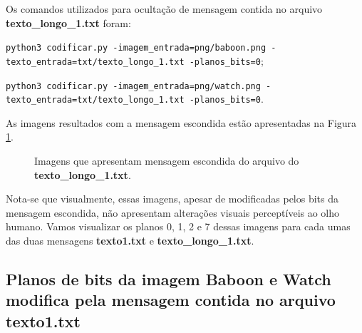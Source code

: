 \documentclass{article}
\begin{document}
\newpage\noindent
Os comandos utilizados para ocultação de mensagem contida no arquivo \textbf{texto\_longo\_1.txt} foram:

\lstinline{python3 codificar.py -imagem_entrada=png/baboon.png -texto_entrada=txt/texto_longo_1.txt -planos_bits=0};

\lstinline{python3 codificar.py -imagem_entrada=png/watch.png -texto_entrada=txt/texto_longo_1.txt -planos_bits=0}.

\noindent
As imagens resultados com a mensagem escondida estão apresentadas na Figura \ref{fig:imagem:saida2}.

\begin{figure}[htp]%
	\centering
	\qquad
	\caption{Imagens que apresentam mensagem escondida do arquivo do \textbf{texto\_longo\_1.txt}.}%
	\label{fig:imagem:saida2}%
\end{figure}


Nota-se que visualmente, essas imagens, apesar de modificadas pelos bits da mensagem escondida, não apresentam alterações visuais perceptíveis ao olho humano. Vamos visualizar os planos 0, 1, 2 e 7 dessas imagens para cada umas das duas mensagens \textbf{texto1.txt} e \textbf{texto\_longo\_1.txt}. 


\subsection{Planos de bits da imagem Baboon e Watch modifica pela mensagem contida no arquivo texto1.txt}
\end{document}
